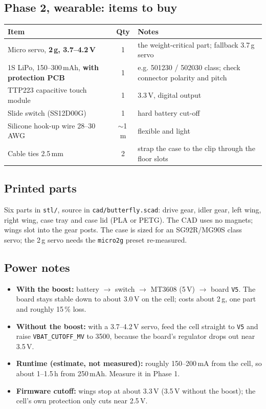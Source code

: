\documentclass[11pt,a4paper]{article}
\begin{document}
\subsection{Phase 2, wearable: items to buy}
\begin{center}
\begin{tabular}{@{}p{5.2cm}cp{6.3cm}@{}}
\toprule
Item & Qty & Notes \\ \midrule
Micro servo, \textbf{2\,g, 3.7--4.2\,V} & 1 & the weight-critical part; fallback 3.7\,g servo \\
1S LiPo, 150--300\,mAh, \textbf{with protection PCB} & 1 & e.g. 501230 / 502030 class; check connector polarity and pitch \\
TTP223 capacitive touch module & 1 & 3.3\,V, digital output \\
Slide switch (SS12D00G) & 1 & hard battery cut-off \\
Silicone hook-up wire 28--30\,AWG & $\sim$1\,m & flexible and light \\
Cable ties 2.5\,mm & 2 & strap the case to the clip through the floor slots \\
\bottomrule
\end{tabular}
\end{center}

\subsection{Printed parts}
Six parts in \texttt{stl/}, source in \texttt{cad/butterfly.scad}: drive gear, idler gear, left wing,
right wing, case tray and case lid (PLA or PETG). The CAD uses no magnets; wings slot into the gear posts.
The case is sized for an SG92R/MG90S class servo; the 2\,g servo needs the \texttt{micro2g} preset re-measured.

\subsection{Power notes}
\begin{itemize}
  \item \textbf{With the boost:} battery $\to$ switch $\to$ MT3608 (5\,V) $\to$ board \texttt{V5}. The board stays
        stable down to about 3.0\,V on the cell; costs about 2\,g, one part and roughly 15\,\% loss.
  \item \textbf{Without the boost:} with a 3.7--4.2\,V servo, feed the cell straight to \texttt{V5} and raise
        \texttt{VBAT\_CUTOFF\_MV} to 3500, because the board's regulator drops out near 3.5\,V.
  \item \textbf{Runtime (estimate, not measured):} roughly 150--200\,mA from the cell, so about 1--1.5\,h from
        250\,mAh. Measure it in Phase 1.
  \item \textbf{Firmware cutoff:} wings stop at about 3.3\,V (3.5\,V without the boost); the cell's own
        protection only cuts near 2.5\,V.
\end{itemize}
\end{document}
